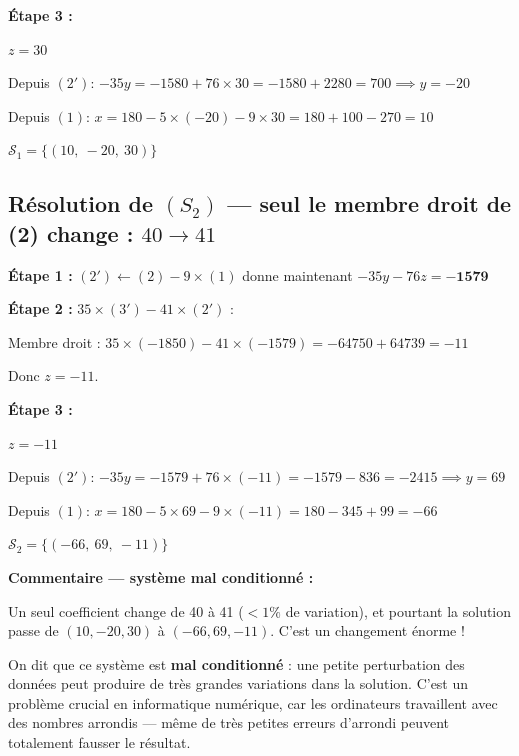 \documentclass[12pt,a4paper]{article}
\begin{document}
\textbf{Étape 3 :}

$z = 30$

Depuis $(2')$: $-35y = -1580 + 76\times 30 = -1580 + 2280 = 700 \implies y = -20$

Depuis $(1)$: $x = 180 - 5\times(-20) - 9\times 30 = 180 + 100 - 270 = 10$

\begin{solbox}
$\mathcal{S}_1 = \{(10,\ -20,\ 30)\}$
\end{solbox}

\subsection*{Résolution de $(S_2)$ --- seul le membre droit de (2) change : $40 \to 41$}

\textbf{Étape 1 :} $(2') \leftarrow (2) - 9\times(1)$ donne maintenant $-35y - 76z = \mathbf{-1579}$

\textbf{Étape 2 :} $35\times(3') - 41\times(2')$ :

Membre droit : $35\times(-1850) - 41\times(-1579) = -64750 + 64739 = -11$

Donc $z = -11$.

\textbf{Étape 3 :}

$z = -11$

Depuis $(2')$: $-35y = -1579 + 76\times(-11) = -1579 - 836 = -2415 \implies y = 69$

Depuis $(1)$: $x = 180 - 5\times 69 - 9\times(-11) = 180 - 345 + 99 = -66$

\begin{solbox}
$\mathcal{S}_2 = \{(-66,\ 69,\ -11)\}$
\end{solbox}

\begin{noteimportante}
\textbf{Commentaire --- système mal conditionné :}

Un seul coefficient change de 40 à 41 ($< 1\%$ de variation), et pourtant la solution passe de $(10, -20, 30)$ à $(-66, 69, -11)$. C'est un changement énorme !

On dit que ce système est \textbf{mal conditionné} : une petite perturbation des données peut produire de très grandes variations dans la solution. C'est un problème crucial en informatique numérique, car les ordinateurs travaillent avec des nombres arrondis --- même de très petites erreurs d'arrondi peuvent totalement fausser le résultat.
\end{noteimportante}

\end{document}
